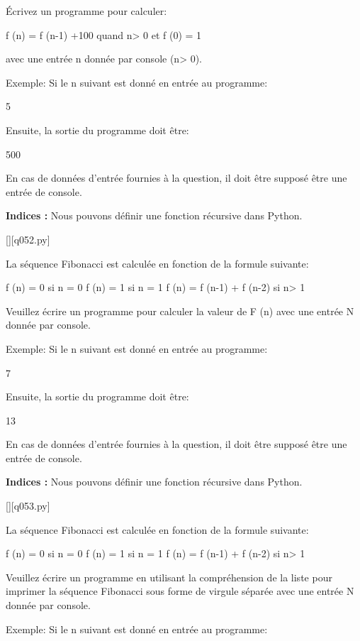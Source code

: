 \question
Écrivez un programme pour calculer:

f (n) = f (n-1) +100 quand n> 0
et f (0) = 1

avec une entrée n donnée par console (n> 0).

Exemple:
Si le n suivant est donné en entrée au programme:

5

Ensuite, la sortie du programme doit être:

500

En cas de données d'entrée fournies à la question, il doit être supposé être une entrée de console.
\par
\textbf{Indices : }Nous pouvons définir une fonction récursive dans Python.
\renewcommand{\nomfichier}{q052.py}
\begin{solution}
    \pythonfile{\chemincode \nomfichier}[][q052.py]
\end{solution}


\question
La séquence Fibonacci est calculée en fonction de la formule suivante:


f (n) = 0 si n = 0
f (n) = 1 si n = 1
f (n) = f (n-1) + f (n-2) si n> 1

Veuillez écrire un programme pour calculer la valeur de F (n) avec une entrée N donnée par console.

Exemple:
Si le n suivant est donné en entrée au programme:

7

Ensuite, la sortie du programme doit être:

13

En cas de données d'entrée fournies à la question, il doit être supposé être une entrée de console.
\par
\textbf{Indices : }Nous pouvons définir une fonction récursive dans Python.
\renewcommand{\nomfichier}{q053.py}
\begin{solution}
    \pythonfile{\chemincode \nomfichier}[][q053.py]
\end{solution}


\question
La séquence Fibonacci est calculée en fonction de la formule suivante:


f (n) = 0 si n = 0
f (n) = 1 si n = 1
f (n) = f (n-1) + f (n-2) si n> 1

Veuillez écrire un programme en utilisant la compréhension de la liste pour imprimer la séquence Fibonacci sous forme de virgule séparée avec une entrée N donnée par console.

Exemple:
Si le n suivant est donné en entrée au programme:

